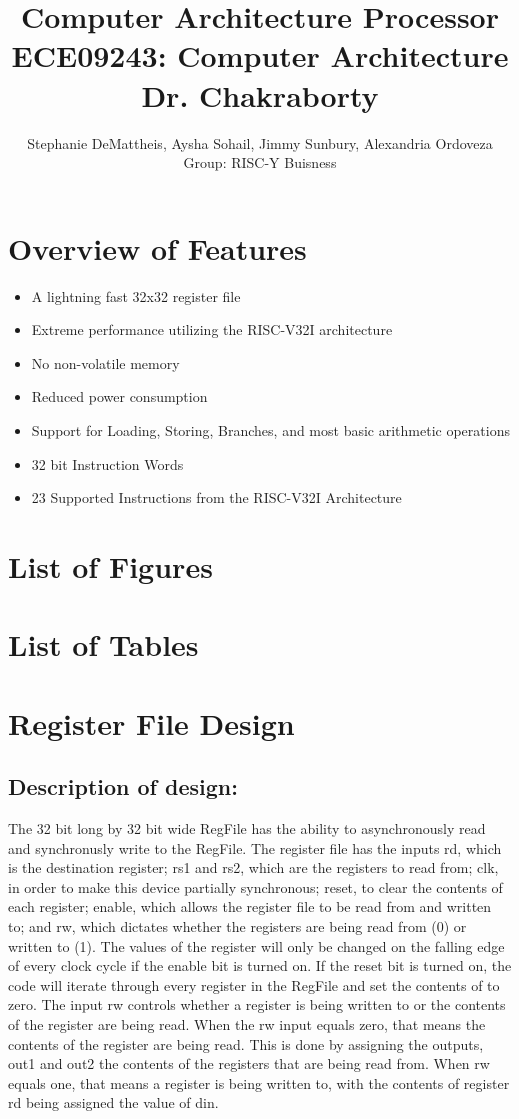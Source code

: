 \documentclass[10pt,letterpaper]{article}
\title{Computer Architecture Processor\\
	\large ECE09243: Computer Architecture\\
Dr. Chakraborty}
\author{Stephanie DeMattheis, Aysha Sohail, Jimmy Sunbury, Alexandria Ordoveza\\
Group: RISC-Y Buisness}
\begin{document}
\centering
\maketitle
\newpage
\raggedright
\section{Overview of Features}
\begin{itemize}
	\item A lightning fast 32x32 register file
	\item Extreme performance utilizing the RISC-V32I architecture
	\item No non-volatile memory
	\item Reduced power consumption
	\item Support for Loading, Storing, Branches, and most basic arithmetic operations
	\item 32 bit Instruction Words
	\item 23 Supported Instructions from the RISC-V32I Architecture
\end{itemize}
\newpage
\tableofcontents
\newpage
\section{List of Figures}
\listoffigures
\newpage
\section{List of Tables}
\listoftables
\newpage
\section{Register File Design}
\subsection{Description of design:}
The 32 bit long by 32 bit wide RegFile has the ability to asynchronously read and synchronusly write to the RegFile. The register file has the inputs rd, which is the destination register; rs1 and  rs2, which are the registers to read from; clk, in order to make this device partially synchronous; reset, to clear the contents of each register; enable, which allows the register file to be read from and written to; and rw, which dictates whether the registers are being read from (0) or written to (1). The values of the register will only be changed on the falling edge of every clock cycle if the enable bit is turned on. If the reset bit is turned on, the code will iterate through every register in the RegFile and set the contents of to zero. The input rw controls whether a register is being written to or the contents of the register are being read. When the rw input equals zero, that means the contents of the register are being read. This is done by assigning the outputs, out1 and out2 the contents of the registers that are being read from. When rw equals one, that means a register is being written to, with the contents of register rd being assigned the value of din. 
\end{document}
